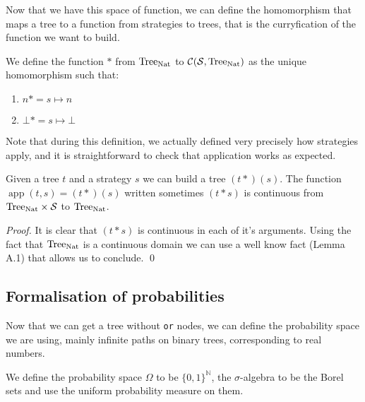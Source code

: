 Now that we have this space of function, we can define the 
homomorphism that maps a tree to a function from strategies 
to trees, that is the curryfication of the function we want to build.

\begin{adefinition}
    We define the function $*$ from $\textnormal{Tree}_{\textnormal{Nat}}$ to $\mathcal{C}(\mathcal{S},\textnormal{Tree}_{\textnormal{Nat}})$
    as the unique homomorphism such that:

    \begin{enumerate}
        \item $n* = s \mapsto n$
        \item $\bot* = s \mapsto \bot$
    \end{enumerate}
\end{adefinition}

Note that during this definition, we actually defined very precisely 
how strategies apply, and it is straightforward to check that 
application works as expected.

\begin{alemma}[Continuity]
    Given a tree $t$ and a strategy $s$ we can 
    build a tree $(t*) (s)$. The function 
    $\operatorname{app}(t,s) = (t*)(s)$ written sometimes
    $(t*s)$ 
    is continuous 
    from $\textnormal{Tree}_{\textnormal{Nat}} \times \mathcal{S}$ to $\textnormal{Tree}_{\textnormal{Nat}}$.
\end{alemma}

\begin{proof}
    It is clear that $(t*s)$ is continuous in each of it's 
    arguments. Using the fact that $\textnormal{Tree}_{\textnormal{Nat}}$ is a 
    continuous domain we can use a well know fact 
    \cite{battenfeld2009two} (Lemma A.1) that allows us to conclude.
    \qed
\end{proof}


\subsection{Formalisation of probabilities}

Now that we can get a tree without \texttt{or} nodes,
we can define the probability space we are using, mainly 
infinite paths on binary trees, corresponding to real numbers.

\begin{adefinition}
    We define the probability space $\Omega$
    to be $\{0,1\}^\mathbb{N}$, the 
    $\sigma$-algebra to be the Borel sets 
    and use the uniform probability measure on them.
\end{adefinition}


